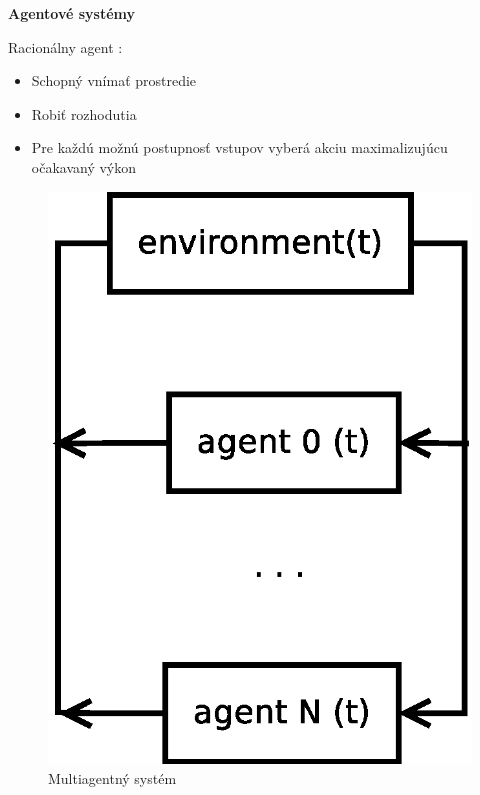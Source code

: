 \documentclass[xcolor=dvipsnames]{beamer}
\begin{document}
\begin{frame}{\bf Agentové systémy}

Racionálny agent :

\begin{minipage}{.5\textwidth}

  \begin{itemize}
  \item Schopný vnímať prostredie
  \item Robiť rozhodutia
  \item Pre každú možnú postupnosť vstupov vyberá akciu maximalizujúcu očakavaný výkon
  \end{itemize}

\end{minipage}%
\begin{minipage}{.5\textwidth}

    \begin{figure}[!htb]
    \centering
    \includegraphics[scale=.3]{../diagrams/multiagent_diagram.eps}
    \caption{Multiagentný systém}
    \label{fig:multiagent_system}
    \end{figure}

\end{minipage}


\end{frame}
\end{document}
